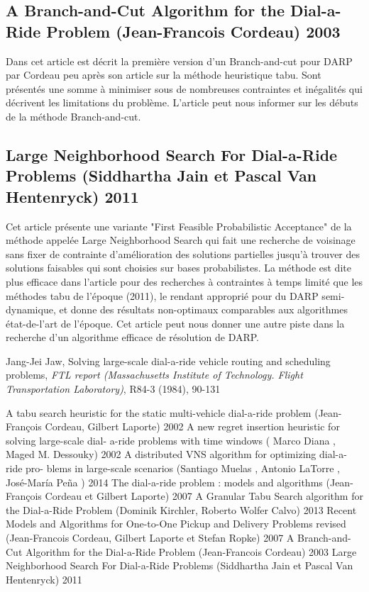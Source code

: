 \documentclass[10pt,a4paper]{report}
\begin{document}
\subsection*{A Branch-and-Cut Algorithm for the Dial-a-Ride Problem (Jean-Francois Cordeau) 2003}
Dans cet article est décrit la première version d'un Branch-and-cut pour DARP par Cordeau peu après son article sur la méthode heuristique tabu. Sont présentés une somme à minimiser sous de nombreuses contraintes et inégalités qui décrivent les limitations du problème. L'article peut nous informer sur les débuts de la méthode Branch-and-cut.
\subsection*{Large Neighborhood Search For Dial-a-Ride Problems (Siddhartha Jain et Pascal Van Hentenryck) 2011}
Cet article présente une variante "First Feasible Probabilistic Acceptance" de la méthode appelée Large Neighborhood Search qui fait une recherche de voisinage sans fixer de contrainte d'amélioration des solutions partielles jusqu'à trouver des solutions faisables qui sont choisies sur bases probabilistes. La méthode est dite plus efficace dans l'article pour des recherches à contraintes à temps limité que les méthodes tabu de l'époque (2011), le rendant approprié pour du DARP semi-dynamique, et donne des résultats non-optimaux comparables aux algorithmes état-de-l'art de l'époque. 
Cet article peut nous donner une autre piste dans la recherche d'un algorithme efficace de résolution de DARP.
\begin{thebibliography}{20}
Jang-Jei Jaw, Solving large-scale dial-a-ride vehicle routing and scheduling problems,  \textit{FTL report (Massachusetts Institute of Technology. Flight Transportation Laboratory)}, R84-3 (1984), 90-131


A tabu search heuristic for the static multi-vehicle
dial-a-ride problem (Jean-François Cordeau, Gilbert Laporte) 2002
\bibitem{}
A new regret insertion heuristic for solving large-scale dial-
a-ride problems with time windows ( Marco Diana , Maged
M. Dessouky) 2002
\bibitem{}
A distributed VNS algorithm for optimizing dial-a-ride pro-
blems in large-scale scenarios (Santiago Muelas , Antonio
LaTorre , José-María Peña ) 2014
\bibitem{}
The dial-a-ride problem : models and algorithms (Jean-
François Cordeau et Gilbert Laporte) 2007
A Granular Tabu Search algorithm for the Dial-a-Ride Problem (Dominik Kirchler, Roberto Wolfer Calvo) 2013
\bibitem{}
Recent Models and Algorithms for One-to-One Pickup and
Delivery Problems revised (Jean-Francois Cordeau, Gilbert
Laporte et Stefan Ropke) 2007
\bibitem{}
A Branch-and-Cut Algorithm for the Dial-a-Ride Problem
(Jean-Francois Cordeau) 2003
\bibitem{}
Large Neighborhood Search For Dial-a-Ride Problems (Siddhartha Jain et Pascal Van Hentenryck) 2011

\end{thebibliography}
\end{document}
